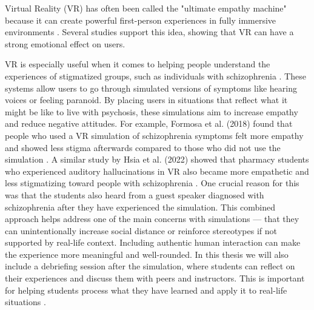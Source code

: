 Virtual Reality (VR) has often been called the "ultimate empathy machine" because it can create powerful first-person experiences in fully immersive environments \cite{Milk2015}. Several studies support this idea, showing that VR can have a strong emotional effect on users.

VR is especially useful when it comes to helping people understand the experiences of stigmatized groups, such as individuals with schizophrenia \cite{Formosa2018, Marques2022, Mattsson2024}. These systems allow users to go through simulated versions of symptoms like hearing voices or feeling paranoid. By placing users in situations that reflect what it might be like to live with psychosis, these simulations aim to increase empathy and reduce negative attitudes. For example, Formosa et al. (2018) found that people who used a VR simulation of schizophrenia symptoms felt more empathy and showed less stigma afterwards compared to those who did not use the simulation \cite{Formosa2018}. A similar study by Hsia et al. (2022) showed that pharmacy students who experienced auditory hallucinations in VR also became more empathetic and less stigmatizing toward people with schizophrenia \cite{Hsia2022}. One crucial reason for this was that the students also heard from a guest speaker diagnosed with schizophrenia after they have experienced the simulation. This combined approach helps address one of the main concerns with simulations — that they can unintentionally increase social distance or reinforce stereotypes if not supported by real-life context. Including authentic human interaction can make the experience more meaningful and well-rounded. In this thesis we will also include a debriefing session after the simulation, where students can reflect on their experiences and discuss them with peers and instructors. This is important for helping students process what they have learned and apply it to real-life situations \cite{Hsia2022}.

